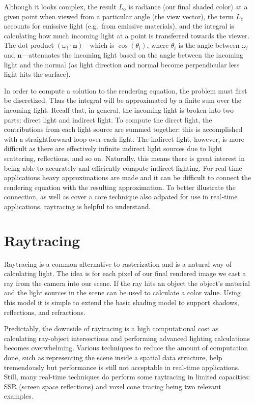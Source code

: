 Although it looks complex, the result $L_o$ is radiance (our final shaded color) at a given point when viewed from a particular angle (the view vector), the term $L_e$ accounts for emissive light (e.g.\ from emissive materials), and the integral is calculating how much incoming light at a point is transferred towards the viewer. The dot product $(\omega_i \cdot \bm{n})$---which is $\cos(\theta_i)$, where $\theta_i$ is the angle between $\omega_i$ and $\bm{n}$---attenuates the incoming light based on the angle between the incoming light and the normal (as light direction and normal become perpendicular less light hits the surface).


In order to compute a solution to the rendering equation, the problem must first be discretized. Thus the integral will be approximated by a finite sum over the incoming light. Recall that, in general, the incoming light is broken into two parts: direct light and indirect light. To compute the direct light, the contributions from each light source are summed together: this is accomplished with a straightforward loop over each light. The indirect light, however, is more difficult as there are effectively infinite indirect light sources due to light scattering, reflections, and so on. Naturally, this means there is great interest in being able to accurately and efficiently compute indirect lighting. For real-time applications heavy approximations are made and it can be difficult to connect the rendering equation with the resulting approximation. To better illustrate the connection, as well as cover a core technique also adpated for use in real-time applications, raytracing is helpful to understand.


\section{Raytracing}
Raytracing is a common alternative to rasterization and is a natural way of calculating light. The idea is for each pixel of our final rendered image we cast a ray from the camera into our scene. If the ray hits an object the object's material and the light sources in the scene can be used to calculate a color value. Using this model it is simple to extend the basic shading model to support shadows, reflections, and refractions.

Predictably, the downside of raytracing is a high computational cost as calculating ray-object intersections and performing advanced lighting calculations becomes overwhelming. Various techniques to reduce the amount of computation done, such as representing the scene inside a spatial data structure, help tremendously but performance is still not acceptable in real-time applications. Still, many real-time techniques do perform some raytracing in limited capacities: SSR (screen space reflections) and voxel cone tracing being two relevant examples.

